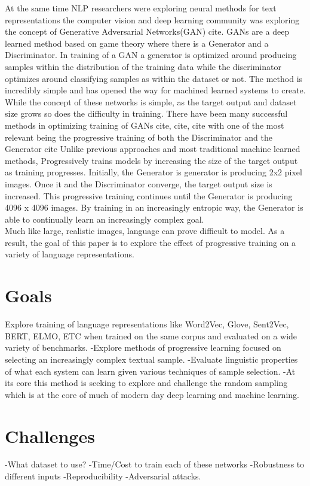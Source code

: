 \documentclass [11pt, proquest] {uwthesis}[2020/08/20]
\begin{document}
At the same time NLP researchers were exploring neural methods for text representations the computer vision and deep learning community was exploring the concept of Generative Adversarial Networks(GAN) cite. GANs are a deep learned method based on game theory where there is a Generator and a Discriminator. In training of a GAN a generator is optimized around producing samples within the distribution of the training data while the discriminator optimizes around classifying samples as within the dataset or not. The method is incredibly simple and has opened the way for machined learned systems to create. While the concept of these networks is simple, as the target output and dataset size grows so does the difficulty in training. There have been many successful methods in optimizing training of GANs cite, cite, cite with one of the most relevant being the progressive training of both the Discriminator and the Generator cite Unlike previous approaches and most traditional machine learned methods, Progressively trains models by increasing the size of the target output as training progresses. Initially, the Generator is generator is producing 2x2 pixel images. Once it and the Discriminator converge, the target output size is increased. This progressive training continues until the Generator is producing 4096 x 4096 images. By training in an increasingly entropic way, the Generator is able to continually learn an increasingly complex goal. \\
Much like large, realistic images, language can prove difficult to model. As a result, the goal of this paper is to explore the effect of progressive training on a variety of language representations.
\section {Goals}
Explore training of language representations like Word2Vec, Glove, Sent2Vec, BERT, ELMO, ETC when trained on the same corpus and evaluated on a wide variety of benchmarks.
-Explore methods of progressive learning focused on selecting an increasingly complex textual sample.
-Evaluate linguistic properties of what each system can learn given various techniques of sample selection.
-At its core this method is seeking to explore and challenge the random sampling which is at the core of much of modern day deep learning and machine learning. 
\section {Challenges}
-What dataset to use?
-Time/Cost to train each of these networks
-Robustness to different inputs
-Reproducibility
-Adversarial attacks.
\end{document}
